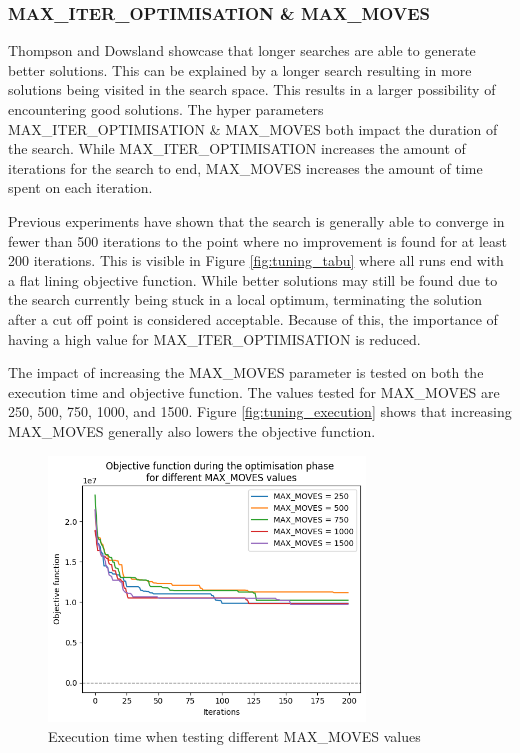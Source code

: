 \subsubsection{MAX\_ITER\_OPTIMISATION \& MAX\_MOVES}

Thompson and Dowsland \cite{thompson1996} showcase that longer searches are able to generate better solutions. This can be explained by a longer search resulting in more solutions being visited in the search space. This results in a larger possibility of encountering good solutions. The hyper parameters MAX\_ITER\_OPTIMISATION \& MAX\_MOVES both impact the duration of the search. While MAX\_ITER\_OPTIMISATION increases the amount of iterations for the search to end, MAX\_MOVES increases the amount of time spent on each iteration. 

Previous experiments have shown that the search is generally able to converge in fewer than 500 iterations to the point where no improvement is found for at least 200 iterations. This is visible in Figure \ref{fig:tuning_tabu} where all runs end with a flat lining objective function. While better solutions may still be found due to the search currently being stuck in a local optimum, terminating the solution after a cut off point is considered acceptable. Because of this, the importance of having a high value for MAX\_ITER\_OPTIMISATION is reduced.

The impact of increasing the MAX\_MOVES parameter is tested on both the execution time and objective function. The values tested for MAX\_MOVES are 250, 500, 750, 1000, and 1500. Figure \ref{fig:tuning_execution} shows that increasing MAX\_MOVES generally also lowers the objective function. 

\begin{figure}[H]
	\centering
	\includegraphics[width=0.75\textwidth]{images/tuning/max_moves_objective.png} 
	\caption{Execution time when testing different MAX\_MOVES values}
	\label{fig:tuning_objective}
\end{figure}

